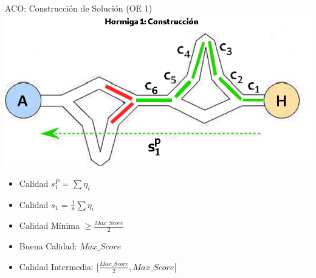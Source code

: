 \begin{frame}{ACO: Construcci\'on de Soluci\'on (OE 1)}
\centering
\includegraphics[scale=0.4]{Pictures/ACO-ant-Constr-choices.png}
\begin{itemize}
    \item Calidad $s^{P}_1$ = $\sum \eta_{i}$
    \item Calidad $s_1$ = $\frac{1}{n}\sum \eta_{i} $
    \item Calidad M\'inima $\geq \frac{Max\_Score}{2}$
    \item Buena Calidad: $Max\_Score$
    \item Calidad Intermedia: $[\frac{Max\_Score}{2}, Max\_Score[$
\end{itemize}
\end{frame}


